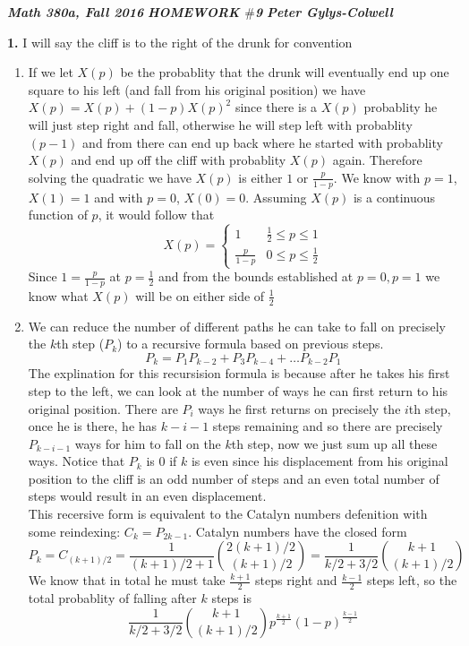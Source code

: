 \documentclass[12pt]{article}
\newenvironment{ques}{\vspace{2 ex}}{\vspace{2 ex}}
\theoremstyle{definition}
\begin{document}
\noindent \textit{\textbf{Math 380a, Fall 2016}} \hspace{1.3cm}
\textit{\textbf{HOMEWORK $\#$9}} \hspace{1.3cm} \textit{\textbf{Peter
Gylys-Colwell}} 

\vspace{1cm}

\begin{ques}
	\textbf{1.} 
		I will say the cliff is to the right of the drunk for convention
		\begin{enumerate}
			\item
				If we let $X(p)$ be the probablity that the drunk
				will eventually end up one square to his left
				(and fall from his original position) we have
				$X(p) = X(p) + (1-p)X(p)^2$ since there is a $X(p)$
				probablity he will just step right and fall,
				otherwise he will step left with probablity
				$(p-1)$ and from there can end up back where he
				started with probablity $X(p)$ and end up off the
				cliff with probablity $X(p)$ again. Therefore
				solving the quadratic we have  $X(p)$
				is either $1$ or $\frac{p}{1-p}$. We know with
				$p = 1$, $X(1) = 1$ and with $p = 0$, $X(0) =
				0$. Assuming $X(p)$ is a continuous function of
				$p$, it would follow that 
				$$X(p) = \begin{cases}
					1 & \frac{1}{2} \leq p \leq 1\\
					\frac{p}{1-p} & 0 \leq p \leq
					\frac{1}{2}
				\end{cases}$$
				Since $1 = \frac{p}{1 - p}$ at $p =
				\frac{1}{2}$ and from the bounds established at
				$p=0, p= 1$ we know what $X(p)$ will be on
				either side of $\frac{1}{2}$
			\item
				We can reduce the number of different paths he
				can take to fall on precisely the $k$th step ($P_k$)
				to a recursive formula based on previous steps.
				$$P_k = P_1P_{k-2} + P_3P_{k-4} +
				\dots P_{k-2}P_1$$
				The explination for this recursision formula is
				because after he takes his first step to the
				left, we can look at the number of ways he can
				first return to his original position. There
				are $P_i$ ways he first returns on precisely
				the $i$th step, once he is there, he has $k-i - 1$
				steps remaining and so there are precisely
				$P_{k-i - 1}$ ways for him to fall on the $k$th
				step, now we just sum up all these ways. Notice
				that $P_k$ is $0$ if $k$ is even since his
				displacement from his original position to the
				cliff is an odd number of steps and an even
				total number of steps would result in an even
				displacement.\\
				This recersive form is equivalent to the
				Catalyn numbers defenition with some
				reindexing: $C_k = P_{2k - 1}$. Catalyn numbers
				have the closed form
				$$P_k = C_{(k+1)/2} =
				\frac{1}{(k+1)/2+1}\binom{2(k+1)/2}{(k+1)/2} =
				\frac{1}{k/2 + 3/2}\binom{k+1}{(k+1)/2}$$
				We know that in total he must take $\frac{k +
				1}{2}$ steps right and $\frac{k-1}{2}$ steps
				left, so the total probablity of falling after $k$ steps is
				$$\frac{1}{k/2 + 3/2}\binom{k+1}{(k+1)/2}
				p^{\frac{k+1}{2}}(1-p)^{\frac{k-1}{2}}$$
		\end{enumerate}


\end{ques}
\end{document}
